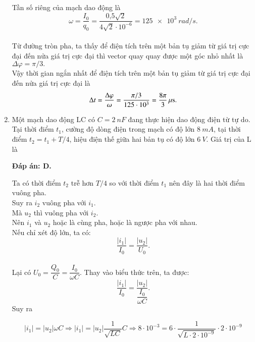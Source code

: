 \begin{enumerate}[label=\bfseries Câu \arabic*:]
{		Tần số riêng của mạch dao động là 
		$$
		\omega = \dfrac{I_0}{q_0} = \dfrac{\text{0,5} \sqrt{2}}{4 \sqrt{2} \cdot10^{-6}} = \SI{125 e3}{rad/s}.
		$$ \\
		Từ đường tròn pha, ta thấy để điện tích trên một bản tụ giảm từ giá trị cực đại đến nửa giá trị cực đại thì vector quay quay được một góc nhỏ nhất là $\Delta \varphi = \pi /3.$ \\
		Vậy thời gian ngắn nhất để điện tích trên một bản tụ giảm từ giá trị cực đại đến nửa giá trị cực đại là
		$$
		\Delta t = \dfrac{\Delta \varphi}{\omega} = \dfrac{\pi / 3}{125\cdot10^{3}} = \xsi{\dfrac{8\pi}{3}}{\mu s}.
		$$
	}
	
	
	
	\item {}
	
	{Một mạch dao động LC có $C = \SI{2}{nF}$ đang thực hiện dao động điện từ tự do. Tại thời điểm $t_1$, cường độ dòng điện trong mạch có độ lớn $\SI{8}{mA}$, tại thời điểm $t_2 = t_1 +T/4$, hiệu điện thế giữa hai bản tụ có độ lớn $\SI{6}{V}$. Giá trị của L là 
	}
	
	\hideall
	{		\textbf{Đáp án: D.}
		
		Ta có thời điểm $t_2$ trễ hơn $T/4$ so với thời điểm $t_1$ nên đây là hai thời điểm vuông pha. \\
		Suy ra $i_2$ vuông pha với $i_1$. \\
		Mà $u_2$ thì vuông pha với $i_2$. \\
		Nên $i_1$ và $u_2$ hoặc là cùng pha, hoặc là ngược pha với nhau. \\
		Nếu chỉ xét độ lớn, ta có:
		$$
		\dfrac{|i_1|}{I_0} = \dfrac{|u_2|}{U_0}.
		$$ \\
		Lại có $U_0 = \dfrac{Q_0}{C} = \dfrac{I_0}{\omega C}$. Thay vào biểu thức trên, ta được:
		$$
		\dfrac{|i_1|}{I_0} = \dfrac{|u_2|}{\dfrac{I_0}{\omega C}}.
		$$
		Suy ra 
		
		$$|i_1| = |u_2|\omega C \Rightarrow |i_1| = |u_2|\dfrac{1}{\sqrt{LC}} C \Rightarrow 8\cdot10^{-3} = 6 \cdot \dfrac{1}{\sqrt{L \cdot 2\cdot10^{-9}}} \cdot 2\cdot10^{-9}$$
		
}
\end{enumerate}
